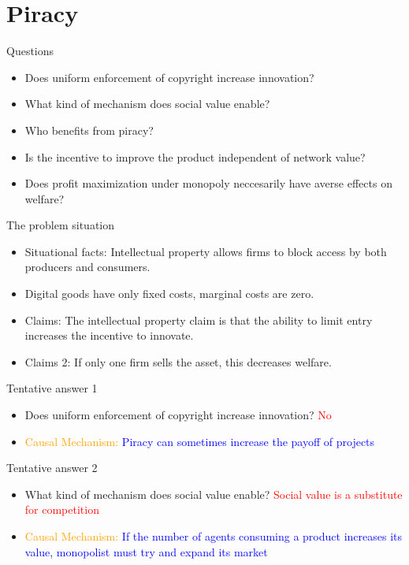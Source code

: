 \documentclass{beamer}
\numberwithin{equation}{section}
\begin{document}
\section{Piracy}
\begin{frame}{Questions}
\begin{itemize}
    \item Does uniform enforcement of copyright increase innovation?
    \item What kind of mechanism does social value enable? 
    \item Who benefits from piracy? 
    \item Is the incentive to improve the product independent of network value? 
    \item Does profit maximization under monopoly neccesarily have averse effects on welfare?
\end{itemize}
\end{frame}
\begin{frame}{The problem situation}
\begin{itemize}
    \item Situational facts: Intellectual property allows firms to block access by both producers and consumers.
    \item Digital goods have only fixed costs, marginal costs are zero. 
    \item Claims: The intellectual property claim is that the ability to limit entry increases the incentive to innovate.    
    \item Claims 2: If only one firm sells the asset, this decreases welfare. 
\end{itemize}
\end{frame}
\begin{frame}{Tentative answer 1}
\begin{itemize}
    \item Does uniform enforcement of copyright increase innovation? \textcolor{red}{No}
    \item \textcolor{orange}{Causal Mechanism:} \textcolor{blue}{Piracy can sometimes increase the payoff of projects}
\end{itemize}
\end{frame}
\begin{frame}{Tentative answer 2}
\begin{itemize}
    \item What kind of mechanism does social value enable? \textcolor{red}{Social value is a substitute for competition}
    \item \textcolor{orange}{Causal Mechanism:} \textcolor{blue}{If the number of agents consuming a product increases its value, monopolist must try and expand its market}
\end{itemize}
\end{frame}
\end{document}
